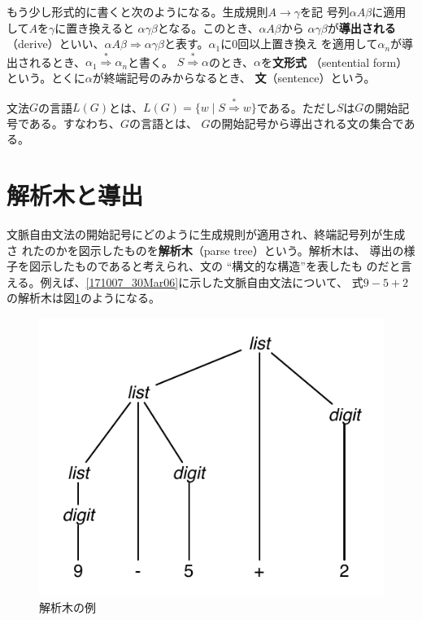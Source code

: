 もう少し形式的に書くと次のようになる。生成規則$A \rightarrow \gamma$を記
号列$\alpha A\beta$に適用して$A$を$\gamma$に置き換えると
$\alpha\gamma\beta$となる。このとき、$\alpha A\beta$から
$\alpha\gamma\beta$が{\bfseries 導出される}（derive）といい、$\alpha
A\beta \Rightarrow \alpha\gamma\beta$と表す。$\alpha_1$に0回以上置き換え
を適用して$\alpha_n$が導出されるとき、$\alpha_1
\stackrel{*}{\Rightarrow} \alpha_n$と書く。
$S \stackrel{*}{\Rightarrow} \alpha$のとき、$\alpha$を{\bfseries 文形式}
（sentential form）という。とくに$\alpha$が終端記号のみからなるとき、
{\bfseries 文}（sentence）という。

文法$G$の言語$L(G)$とは、$L(G) = \{w \mid S \stackrel{*}{\Rightarrow}
w\}$である。ただし$S$は$G$の開始記号である。すなわち、$G$の言語とは、
$G$の開始記号から導出される文の集合である。


\section{解析木と導出}

文脈自由文法の開始記号にどのように生成規則が適用され、終端記号列が生成さ
れたのかを図示したものを{\bfseries 解析木}（parse tree）という。解析木は、
導出の様子を図示したものであると考えられ、文の ``構文的な構造''を表したも
のだと言える。例えば、\eqref{171007_30Mar06}に示した文脈自由文法について、
式$9-5+2$の解析木は図\ref{152653_30Mar06}のようになる。

\begin{figure}
 \begin{center}
  \includegraphics{figure/parse_tree_01.pdf}
 \end{center}
 \caption{解析木の例}
 \label{152653_30Mar06}
\end{figure}

